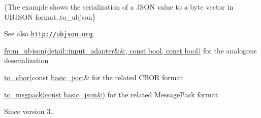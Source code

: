 \{The example shows the serialization of a J\+S\+ON value to a byte vector in U\+B\+J\+S\+ON format.,to\+\_\+ubjson\}

\begin{DoxySeeAlso}{See also}
\href{http://ubjson.org}{\tt http\+://ubjson.\+org} 

\hyperlink{classnlohmann_1_1basic__json_a1ed52b463d2ef14c85ed076467168c72}{from\+\_\+ubjson(detail\+::input\+\_\+adapter\&\&, const bool, const bool)} for the analogous deserialization 

\hyperlink{classnlohmann_1_1basic__json_a2566783e190dec524bf3445b322873b8}{to\+\_\+cbor}(const \hyperlink{classnlohmann_1_1basic__json}{basic\+\_\+json}\& for the related C\+B\+OR format 

\hyperlink{classnlohmann_1_1basic__json_a09ca1dc273d226afe0ca83a9d7438d9c}{to\+\_\+msgpack(const basic\+\_\+json\&)} for the related Message\+Pack format
\end{DoxySeeAlso}
\begin{DoxySince}{Since}
version 3.. 
\end{DoxySince}
